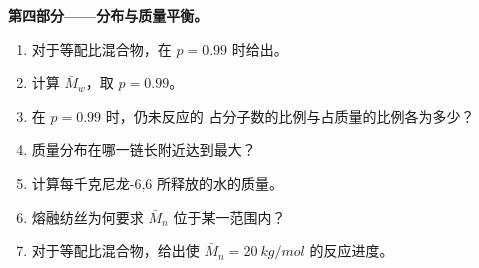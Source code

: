 \begin{problem}
\medskip
\noindent\textbf{第四部分——分布与质量平衡。}
\begin{enumerate}[resume]
  \item 对于等配比混合物，在 $p = 0.99$ 时给出。
  \item 计算 $\bar M_w$，取 $p = 0.99$。
  \item 在 $p = 0.99$ 时，仍未反应的
        占分子数的比例与占质量的比例各为多少？
  \item 质量分布在哪一链长附近达到最大？
  \item 计算每千克尼龙-6,6 所释放的水的质量。
  \item 熔融纺丝为何要求 $\bar M_n$ 位于某一范围内？
  \item 对于等配比混合物，给出使 $\bar M_n = \qty{20}{kg/mol}$ 的反应进度。
\end{enumerate}
\end{problem}
